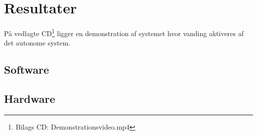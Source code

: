 \chapter{Resultater}

På vedlagte CD\footnote{Bilags CD: Demonstrationsvideo.mp4} ligger en demonstration af systemet hvor vanding aktiveres af det autonome system.

\section{Software}


\section{Hardware}
